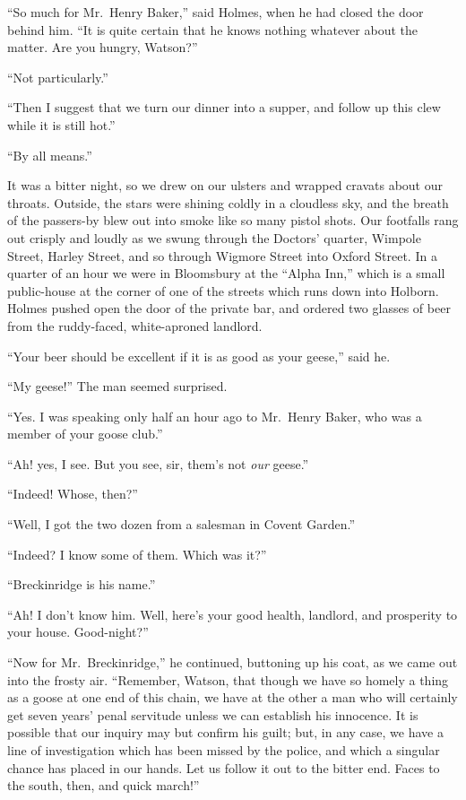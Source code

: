“So much for Mr.~Henry Baker,” said Holmes, when he
had closed the door behind him. “It is quite certain that he
knows nothing whatever about the matter. Are you hungry,
Watson?”

“Not particularly.”

“Then I suggest that we turn our dinner into a supper, and
follow up this clew while it is still hot.”

“By all means.”

It was a bitter night, so we drew on our ulsters and wrapped
cravats about our throats. Outside, the stars were shining
coldly in a cloudless sky, and the breath of the passers-by
blew out into smoke like so many pistol shots. Our footfalls
rang out crisply and loudly as we swung through the Doctors’
quarter, Wimpole Street, Harley Street, and so through Wigmore
Street into Oxford Street. In a quarter of an hour we
were in Bloomsbury at the “Alpha Inn,” which is a small
public-house at the corner of one of the streets which runs
down into Holborn. Holmes pushed open the door of the
private bar, and ordered two glasses of beer from the ruddy-faced,
white-aproned landlord.

“Your beer should be excellent if it is as good as your
geese,” said he.

“My geese!” The man seemed surprised.

“Yes. I was speaking only half an hour ago to Mr.~Henry
Baker, who was a member of your goose club.”

“Ah! yes, I see. But you see, sir, them’s not \textit{our} geese.”

“Indeed! Whose, then?”

“Well, I got the two dozen from a salesman in Covent Garden.”

“Indeed? I know some of them. Which was it?”

“Breckinridge is his name.”

“Ah! I don’t know him. Well, here’s your good health,
landlord, and prosperity to your house. Good-night?”

“Now for Mr.~Breckinridge,” he continued, buttoning up
his coat, as we came out into the frosty air. “Remember,
Watson, that though we have so homely a thing as a goose at
one end of this chain, we have at the other a man who will
certainly get seven years’ penal servitude unless we can establish
his innocence. It is possible that our inquiry may
but confirm his guilt; but, in any case, we have a line of
investigation which has been missed by the police, and which a
singular chance has placed in our hands. Let us follow it
out to the bitter end. Faces to the south, then, and quick
march!”

